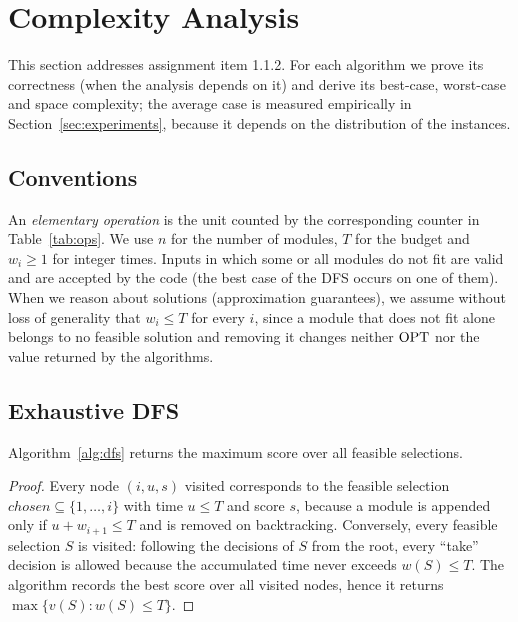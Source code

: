 \section{Complexity Analysis}\label{sec:complexity}

This section addresses assignment item 1.1.2. For each algorithm we prove its correctness (when the analysis depends on it) and derive its best-case, worst-case and space complexity; the average case is measured empirically in Section~\ref{sec:experiments}, because it depends on the distribution of the instances.

\subsection{Conventions}

An \emph{elementary operation} is the unit counted by the corresponding counter in Table~\ref{tab:ops}. We use $n$ for the number of modules, $T$ for the budget and $w_i\ge1$ for integer times. Inputs in which some or all modules do not fit are valid and are accepted by the code (the best case of the DFS occurs on one of them). When we reason about solutions (approximation guarantees), we assume without loss of generality that $w_i\le T$ for every $i$, since a module that does not fit alone belongs to no feasible solution and removing it changes neither $\mathrm{OPT}$ nor the value returned by the algorithms.

\subsection{Exhaustive DFS}

\begin{theorem}\label{thm:dfs-correct}
Algorithm~\ref{alg:dfs} returns the maximum score over all feasible selections.
\end{theorem}
\begin{proof}
Every node $(i,u,s)$ visited corresponds to the feasible selection $chosen\subseteq\{1,\dots,i\}$ with time $u\le T$ and score $s$, because a module is appended only if $u+w_{i+1}\le T$ and is removed on backtracking. Conversely, every feasible selection $S$ is visited: following the decisions of $S$ from the root, every ``take'' decision is allowed because the accumulated time never exceeds $w(S)\le T$. The algorithm records the best score over all visited nodes, hence it returns $\max\{v(S): w(S)\le T\}$.
\end{proof}

